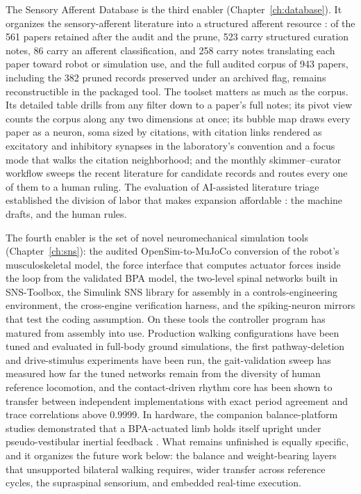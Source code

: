 The Sensory Afferent Database is the third enabler (Chapter~\ref{ch:database}). It organizes the sensory-afferent literature into a structured afferent resource \citep{bolen_sensory_2023}: of the 561 papers retained after the audit and the prune, 523 carry structured curation notes, 86 carry an afferent classification, and 258 carry notes translating each paper toward robot or simulation use, and the full audited corpus of 943 papers, including the 382 pruned records preserved under an archived flag, remains reconstructible in the packaged tool. The toolset matters as much as the corpus. Its detailed table drills from any filter down to a paper's full notes; its pivot view counts the corpus along any two dimensions at once; its bubble map draws every paper as a neuron, soma sized by citations, with citation links rendered as excitatory and inhibitory synapses in the laboratory's convention and a focus mode that walks the citation neighborhood; and the monthly skimmer--curator workflow sweeps the recent literature for candidate records and routes every one of them to a human ruling. The evaluation of AI-assisted literature triage established the division of labor that makes expansion affordable \citep{bolen_using_2024}: the machine drafts, and the human rules.

The fourth enabler is the set of novel neuromechanical simulation tools (Chapter~\ref{ch:sns}): the audited OpenSim-to-MuJoCo conversion of the robot's musculoskeletal model, the force interface that computes actuator forces inside the loop from the validated BPA model, the two-level spinal networks built in SNS-Toolbox, the Simulink SNS library for assembly in a controls-engineering environment, the cross-engine verification harness, and the spiking-neuron mirrors that test the coding assumption. On these tools the controller program has matured from assembly into use. Production walking configurations have been tuned and evaluated in full-body ground simulations, the first pathway-deletion and drive-stimulus experiments have been run, the gait-validation sweep has measured how far the tuned networks remain from the diversity of human reference locomotion, and the contact-driven rhythm core has been shown to transfer between independent implementations with exact period agreement and trace correlations above 0.9999. In hardware, the companion balance-platform studies demonstrated that a BPA-actuated limb holds itself upright under pseudo-vestibular inertial feedback \citep{bolen_balance_2024, bolen_selfbalancing_2024, bolen_selfbalancing_srs_2024}. What remains unfinished is equally specific, and it organizes the future work below: the balance and weight-bearing layers that unsupported bilateral walking requires, wider transfer across reference cycles, the supraspinal sensorium, and embedded real-time execution.

